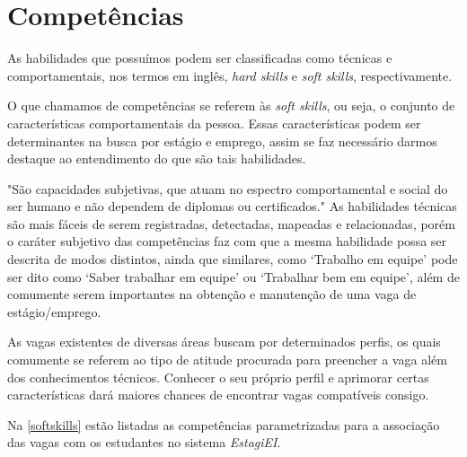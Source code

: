 \section{Competências}

As habilidades que possuímos podem ser classificadas como técnicas e comportamentais, nos termos em inglês, \emph{hard skills} e \emph{soft skills}, respectivamente.

O que chamamos de competências se referem às \emph{soft skills}, ou seja, o conjunto de características comportamentais da pessoa. Essas características podem ser determinantes na busca por estágio e emprego, assim se faz necessário darmos destaque ao entendimento do que são tais habilidades.

"São capacidades subjetivas, que atuam no espectro comportamental e social do ser humano e não dependem de diplomas ou certificados."\cite{alura_softskills} As habilidades técnicas são mais fáceis de serem registradas, detectadas, mapeadas e relacionadas, porém o caráter subjetivo das competências faz com que a mesma habilidade possa ser descrita de modos distintos, ainda que similares, como `Trabalho em equipe' pode ser dito como `Saber trabalhar em equipe' ou `Trabalhar bem em equipe', além de comumente serem importantes na obtenção e manutenção de uma vaga de estágio/emprego.

As vagas existentes de diversas áreas buscam por determinados perfis, os quais comumente se referem ao tipo de atitude procurada para preencher a vaga além dos conhecimentos técnicos. Conhecer o seu próprio perfil e aprimorar certas características dará maiores chances de encontrar vagas compatíveis consigo.

Na \autoref{softskills} estão listadas as competências parametrizadas para a associação das vagas com os estudantes no sistema \emph{EstagiEI}.